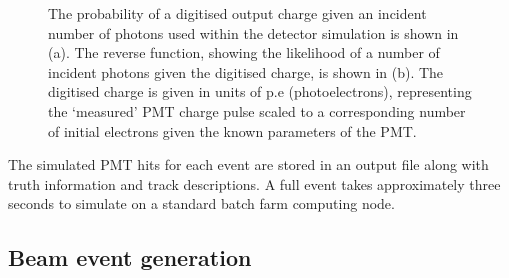 \begin{figure} %
    \centering
    \quad
    \caption[Detector simulation PMT digitisation function]
    {The probability of a digitised output charge given an incident number of photons used within
    the detector simulation is shown in (a). The reverse function, showing the likelihood of a
    number of incident photons given the digitised charge, is shown in (b). The digitised charge
    is given in units of p.e (photoelectrons), representing the `measured' PMT charge pulse scaled
    to a corresponding number of initial electrons given the known parameters of the PMT.}
    \label{fig:digitisation}
\end{figure}

The simulated PMT hits for each event are stored in an output file along with truth information
and track descriptions. A full event takes approximately three seconds to simulate on a standard
batch farm computing node.

\subsection{Beam event generation} %
\label{sec:chips_monte_carlo_beam} %

